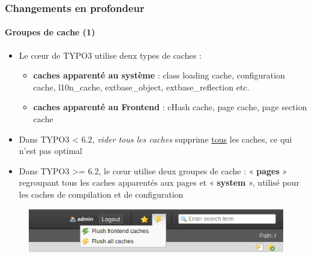 \begin{frame}[fragile]
	\frametitle{Changements en profondeur}
	\framesubtitle{Groupes de cache (1)}

	\begin{itemize}
		\item Le cœur de TYPO3 utilise deux types de caches :

			\begin{itemize}
				\item \textbf{caches apparenté au système} :
				class loading cache, configuration cache, l10n\_cache, extbase\_object, extbase\_reflection etc.
				\item \textbf{caches apparenté au Frontend} :
				cHash cache, page cache, page section cache
			\end{itemize}

		\item Dans TYPO3 < 6.2, \textit{vider tous les caches} supprime \underline{tous} les caches, ce qui n'est pas optimal

		\item Dans TYPO3 >= 6.2, le cœur utilise deux groupes de cache :\newline
			« \textbf{pages} » regroupant tous les caches apparentés aux pages et\newline
			« \textbf{system} », utilisé pour les caches de compilation et de configuration

	\end{itemize}

	\begin{figure}
		\includegraphics[width=0.5\linewidth]{Images/InDepthChanges/CacheGroups.png}
	\end{figure}

\end{frame}


